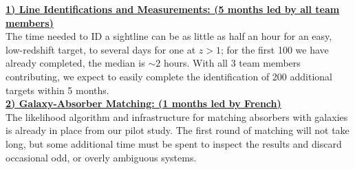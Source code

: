 \documentclass[12pt]{article}
\begin{document}



%
%
\budgetnarrative       %

\noindent \textbf{\underline{1) Line Identifications and Measurements: (5 months led by all team members)}}\\
\indent The time needed to ID a sightline can be as little as half an hour for an easy, low-redshift target, to several days for one at $z>1$; for the first 100 we have already completed, the median is $\sim 2$ hours. With all 3 team members contributing, we expect to easily complete the identification of 200 additional targets within 5 months.\\

\noindent \textbf{\underline{2) Galaxy-Absorber Matching: (1 months led by French)}}\\
\indent The likelihood algorithm and infrastructure for matching absorbers with galaxies is already in place from our pilot study. The first round of matching will not take long, but some additional time must be spent to inspect the results and discard occasional odd, or overly ambiguous systems. \\
\end{document}
